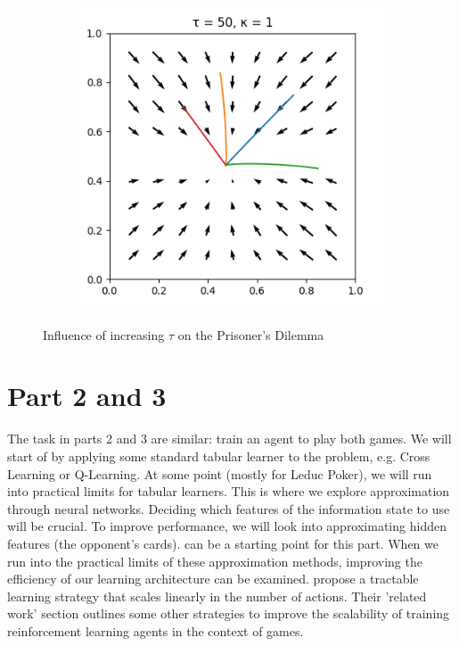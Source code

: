 \documentclass[10pt,a4paper]{article}
\begin{document}
\begin{figure}[h]
\begin{subfigure}[b]{0.30\textwidth}
    \end{subfigure}
    \begin{subfigure}[b]{0.30\textwidth}
        \includegraphics[width=\textwidth]{Figures/boltzmann_pd_temp50.png}
    \end{subfigure}
    \caption{Influence of increasing $\tau$ on the Prisoner's Dilemma}\label{fig:tau}
\end{figure}

\section{Part 2 and 3}
The task in parts 2 and 3 are similar: train an agent to play both games. We will start of by applying some standard tabular learner to the problem, e.g. Cross Learning or Q-Learning. At some point (mostly for Leduc Poker), we will run into practical limits for tabular learners. This is where we explore approximation through neural networks. Deciding which features of the information state to use will be crucial. To improve performance, we will look into approximating hidden features (the opponent's cards). \citet{poker} can be a starting point for this part. When we run into the practical limits of these approximation methods, improving the efficiency of our learning architecture can be examined. \citet{dulacarnold2015deep} propose a tractable learning strategy that scales linearly in the number of actions. Their 'related work' section outlines some other strategies to improve the scalability of training reinforcement learning agents in the context of games. 
\end{document}
